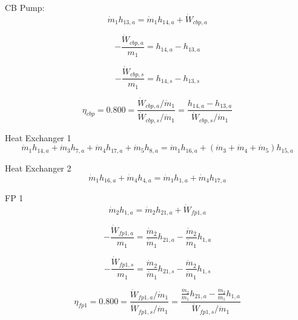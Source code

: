 \documentclass{article}
\begin{document}
CB Pump:
\begin{equation}
\dot{m}_{ 1}h_{13,a} = \dot{m}_{ 1}h_{14,a} + \dot{W}_{cbp,a}
\end{equation}

\begin{equation}
-\frac{\dot{W}_{cbp,a}}{m_1} = h_{14,a} - h_{13,a}\end{equation}

\begin{equation}
-\frac{\dot{W}_{cbp,s}}{m_1} = h_{14,s} - h_{13,s}\end{equation}

\begin{equation}
\eta_{cbp} =    0.800 = \frac{\dot{W}_{cbp,a} / \dot{m}_{1}}{\dot{W}_{cbp,s} / \dot{m}_{1}} = \frac{
h_{14,a} - h_{13,a}}{\dot{W}_{cbp,s} / \dot{m}_{1}}
\end{equation}


Heat Exchanger 1
\begin{equation}
\dot{m}_{ 1}h_{14,a} + \dot{m}_{ 3}h_{ 7,a} + \dot{m}_{ 4}h_{17,a} + \dot{m}_{ 5}h_{ 8,a} = \dot{m}_{ 1}h_{16,a} + (\dot{m}_{ 3} + \dot{m}_{ 4} + \dot{m}_{ 5})h_{15,a}
\end{equation}


Heat Exchanger 2
\begin{equation}
\dot{m}_{ 1}h_{16,a} + \dot{m}_{ 4}h_{ 4,a} = \dot{m}_{ 1}h_{ 1,a} + \dot{m}_{ 4}h_{17,a}
\end{equation}


FP 1
\begin{equation}
\dot{m}_{ 2}h_{ 1,a} = \dot{m}_{ 2}h_{21,a} + \dot{W}_{fp1,a}
\end{equation}

\begin{equation}
-\frac{\dot{W}_{fp1,a}}{m_1} = \frac{\dot{m}_{ 2}}{\dot{m}_{ 1}}h_{21,a} - \frac{\dot{m}_{ 2}}{\dot{m}_{ 1}}h_{ 1,a}\end{equation}

\begin{equation}
-\frac{\dot{W}_{fp1,s}}{m_1} = \frac{\dot{m}_{ 2}}{\dot{m}_{ 1}}h_{21,s} - \frac{\dot{m}_{ 2}}{\dot{m}_{ 1}}h_{ 1,s}\end{equation}

\begin{equation}
\eta_{fp1} =    0.800 = \frac{\dot{W}_{fp1,a} / \dot{m}_{1}}{\dot{W}_{fp1,s} / \dot{m}_{1}} = \frac{
\frac{\dot{m}_{ 2}}{\dot{m}_{ 1}}h_{21,a} - \frac{\dot{m}_{ 2}}{\dot{m}_{ 1}}h_{ 1,a}}{\dot{W}_{fp1,s} / \dot{m}_{1}}
\end{equation}
\end{document}
